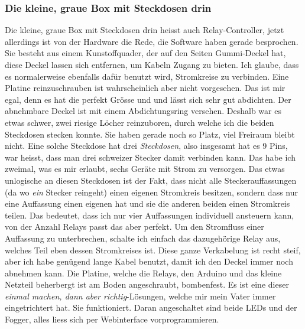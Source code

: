 \documentclass[12pt,titlepage,a4paper]{article}
\begin{document}
\subsubsection{Die kleine, graue Box mit Steckdosen drin}
Die kleine, graue Box mit Steckdosen drin heisst auch Relay-Controller, jetzt allerdings ist von der Hardware die Rede, die Software haben gerade besprochen. Sie besteht aus einem Kunstoffquader, der auf den Seiten Gummi-Deckel hat, diese Deckel lassen sich entfernen, um Kabeln  Zugang zu bieten. Ich glaube, dass es normalerweise ebenfalls dafür benutzt wird, Stromkreise zu verbinden. Eine Platine reinzuschrauben ist wahrscheinlich aber nicht vorgesehen. Das ist mir egal, denn es hat die perfekt Grösse und und lässt sich sehr gut abdichten. Der abnehmbare Deckel ist mit einem Abdichtungsring versehen. Deshalb war es etwas schwer, zwei riesige Löcher reinzuboren, durch welche ich die beiden Steckdosen stecken konnte. Sie haben gerade noch so Platz, viel Freiraum bleibt nicht. Eine solche Steckdose hat drei \textit{Steckdosen}, also insgesamt hat es 9 Pins, war heisst, dass man drei schweizer Stecker damit verbinden kann. Das habe ich zweimal, was es mir erlaubt, sechs Geräte mit Strom zu versorgen. Das etwas unlogische an diesen Steckdosen ist der Fakt, dass nicht alle Steckerauffassungen (da wo \textit{ein} Stecker reingeht) einen eigenen Stromkreis besitzen, sondern dass nur eine Auffassung einen eigenen hat und sie die anderen beiden einen Stromkreis teilen. Das bedeutet, dass ich nur vier Auffassungen individuell ansteuern kann, von der Anzahl Relays passt das aber perfekt. Um den Stromfluss einer Auffassung zu unterbrechen, schalte ich einfach das dazugehörige Relay aus, welches Teil eben dessen Stromkreises ist. Diese ganze Verkabelung ist recht steif, aber ich habe genügend lange Kabel benutzt, damit ich den Deckel immer noch abnehmen kann. Die Platine, welche die Relays, den Arduino und das kleine Netzteil beherbergt ist am Boden angeschraubt, bombenfest. Es ist eine dieser \textit {einmal machen, dann aber richtig}-Lösungen, welche mir mein Vater immer eingetrichtert hat. Sie funktioniert. Daran angeschaltet sind beide LEDs und der Fogger, alles liess sich per Webinterface vorprogrammieren.
\end{document}
